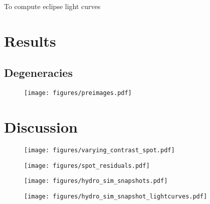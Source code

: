 \documentclass[modern]{aastex631}
\begin{document}
To compute eclipse light curves 
\section{Results}
\label{sec:results}

\subsection{Degeneracies}
\label{ssec:degeneracies}


\begin{figure}[t!]
    \begin{centering}
    \texttt{[image: figures/preimages.pdf]}
    \caption{}
    \label{fig:preimages}
    \end{centering}
\end{figure}





\section{Discussion}
\label{sec:discussion}

\begin{figure}[t!]
    \begin{centering}
    \texttt{[image: figures/varying\_contrast\_spot.pdf]}
    \caption{}
    \label{fig:varying_contrast_spot}
    \end{centering}
\end{figure}

\begin{figure}[t!]
    \begin{centering}
    \texttt{[image: figures/spot\_residuals.pdf]}
    \caption{}
    \label{fig:spot_residuals}
    \end{centering}
\end{figure}

\begin{figure}[t!]
    \begin{centering}
    \texttt{[image: figures/hydro\_sim\_snapshots.pdf]}
    \caption{}
    \label{fig:hydro_sim_snapshots:maps}
    \end{centering}
\end{figure}

\begin{figure}[t!]
    \begin{centering}
    \texttt{[image: figures/hydro\_sim\_snapshot\_lightcurves.pdf]}
    \caption{}
    \label{fig:hydro_sim_snapshots:lightcurves}
    \end{centering}
\end{figure}
\end{document}
